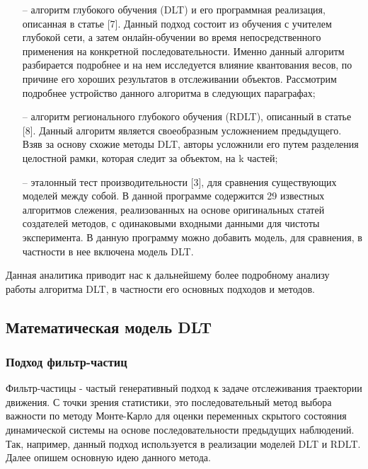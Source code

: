 \begin{itemize}[leftmargin=0em, itemindent=2.5 em,itemsep=1.5 pt,parsep=1.5 pt]

\item[--] алгоритм глубокого обучения (DLT) и его программная реализация, описанная в статье [7]. Данный подход состоит из обучения с учителем глубокой сети, а затем онлайн-обучении во время непосредственного применения на конкретной последовательности. Именно данный алгоритм разбирается подробнее и на нем исследуется влияние квантования весов, по причине его хороших результатов в отслеживании объектов. Рассмотрим подробнее устройство данного алгоритма в следующих параграфах;

\item[--] алгоритм регионального глубокого обучения (RDLT), описанный в статье [8]. Данный алгоритм является своеобразным усложнением предыдущего. Взяв за основу схожие методы DLT, авторы усложнили его путем разделения целостной рамки, которая следит за объектом, на k частей;

\item[--] эталонный тест производительности [3], для сравнения существующих моделей между собой. В данной программе содержится 29 известных алгоритмов слежения, реализованных на основе оригинальных статей создателей методов, с одинаковыми  входными данными для чистоты эксперимента. В данную программу можно добавить модель, для сравнения, в частности в нее включена модель DLT.

\end{itemize}

Данная аналитика приводит нас к дальнейшему более подробному анализу работы алгоритма DLT, в частности его основных подходов и методов.

\subsection{Математическая модель DLT}
\subsubsection{Подход фильтр-частиц} 

Фильтр-частицы - частый генеративный подход к задаче отслеживания траектории движения. С точки зрения статистики, это последовательный метод выбора важности по методу Монте-Карло для оценки переменных скрытого состояния динамической системы на основе последовательности предыдущих наблюдений. Так, например, данный подход используется в реализации моделей DLT  и RDLT. Далее опишем основную идею данного метода.


